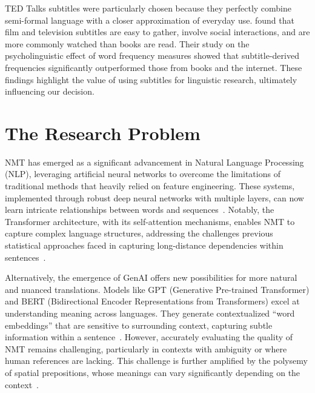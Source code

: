 TED Talks subtitles were particularly chosen because they perfectly combine semi-formal language with a closer approximation of everyday use. \textcite{Brysbaert2009} found that film and television subtitles are easy to gather, involve social interactions, and are more commonly watched than books are read. Their study on the psycholinguistic effect of word frequency measures showed that subtitle-derived frequencies significantly outperformed those from books and the internet. These findings highlight the value of using subtitles for linguistic research, ultimately influencing our decision.

\section{The Research Problem}

NMT has emerged as a significant advancement in Natural Language Processing (NLP), leveraging artificial neural networks to overcome the limitations of traditional methods that heavily relied on feature engineering. These systems, implemented through robust deep neural networks with multiple layers, can now learn intricate relationships between words and sequences~\parencite{TAN20205, wang-etal-2019-learning-deep}. Notably, the Transformer architecture, with its self-attention mechanisms, enables NMT to capture complex language structures, addressing the challenges previous statistical approaches faced in capturing long-distance dependencies within sentences~\parencite{vaswani2017attention, yang2020survey}.

Alternatively, the emergence of GenAI offers new possibilities for more natural and nuanced translations. Models like GPT (Generative Pre-trained Transformer) and BERT (Bidirectional Encoder Representations from Transformers) excel at understanding meaning across languages. They generate contextualized ``word embeddings'' that are sensitive to surrounding context, capturing subtle information within a sentence~\parencite{ethayarajh-2019-contextual}. However, accurately evaluating the quality of NMT remains challenging, particularly in contexts with ambiguity or where human references are lacking. This challenge is further amplified by the polysemy of spatial prepositions, whose meanings can vary significantly depending on the context~\parencite{bartsch-etal-2023-self, comsa2023benchmark, app11146584}.

